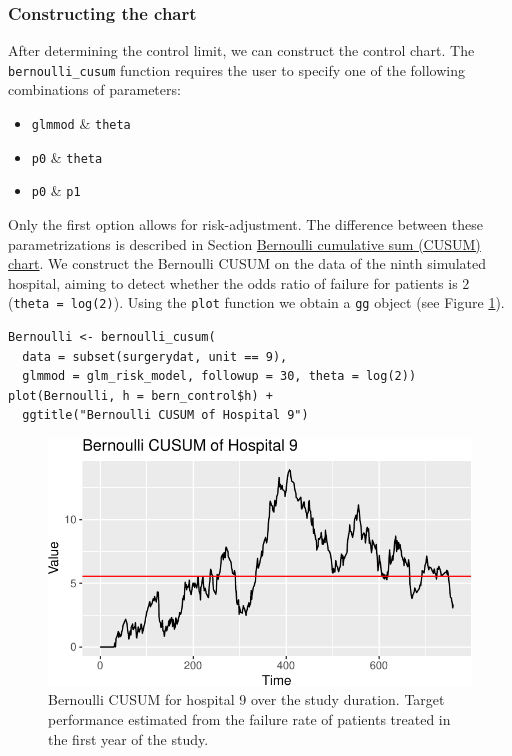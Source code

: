 \hypertarget{sec:constructingthechart}{%
\subsubsection{Constructing the chart}\label{sec:constructingthechart}}

After determining the control limit, we can construct the control chart. The \texttt{bernoulli\_cusum} function requires the user to specify one of the following combinations of parameters:

\begin{itemize}
\tightlist
\item
  \texttt{glmmod} \& \texttt{theta}
\item
  \texttt{p0} \& \texttt{theta}
\item
  \texttt{p0} \& \texttt{p1}
\end{itemize}

Only the first option allows for risk-adjustment. The difference between these parametrizations is described in Section \protect\hyperlink{BernoulliCUSUM}{Bernoulli cumulative sum (CUSUM) chart}. We construct the Bernoulli CUSUM on the data of the ninth simulated hospital, aiming to detect whether the odds ratio of failure for patients is \(2\) (\texttt{theta\ =\ log(2)}). Using the \texttt{plot} function we obtain a \texttt{\textquotesingle{}gg\textquotesingle{}} object (see Figure \ref{fig:Bernoulli2}).

\begin{verbatim}
Bernoulli <- bernoulli_cusum(
  data = subset(surgerydat, unit == 9),
  glmmod = glm_risk_model, followup = 30, theta = log(2))
plot(Bernoulli, h = bern_control$h) + 
  ggtitle("Bernoulli CUSUM of Hospital 9")
\end{verbatim}

\begin{figure}
\centering
\includegraphics{RJ-2023-095_files/figure-latex/Bernoulli2-1.pdf}
\caption{\label{fig:Bernoulli2}Bernoulli CUSUM for hospital 9 over the study duration. Target performance estimated from the failure rate of patients treated in the first year of the study.}
\end{figure}

